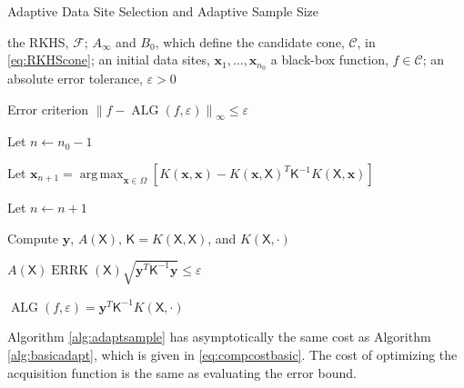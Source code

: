 \documentclass[]{mcom-l}
\theoremstyle{theorem}
\theoremstyle{remark}
\DeclareMathOperator*{\argmax}{arg\,max}
\DeclareMathOperator{\ALG}{ALG}
\DeclareMathOperator{\errK}{ERRK}
\newcommand{\mK}{\mathsf{K}}
\newcommand{\mX}{\mathsf{X}}
\newcommand{\bx}{{\boldsymbol{x}}}
\newcommand{\by}{{\boldsymbol{y}}}
\newcommand{\cc}{\mathcal{C}}
\newcommand{\calf}{{\mathcal{F}}}
\newcommand{\norm}[2][{}]{\ensuremath{\left \lVert #2 \right \rVert}_{#1}}
\begin{document}
\begin{algorithm}[H]
	\caption{Adaptive Data Site Selection and Adaptive Sample Size \label{alg:adaptsample}}
	\begin{algorithmic}
		\PARAM the RKHS, $\calf$; $A_\infty$ and $B_0$, which define  the candidate cone, $\cc$, in \eqref{eq:RKHScone}; an initial data sites, $\bx_1, \ldots, \bx_{n_0}$
		\INPUT a black-box function, $f \in \cc$; an absolute error tolerance, $\varepsilon>0$
		
		\Ensure Error criterion $\norm[\infty]{f - \ALG(f,\varepsilon)} \le \varepsilon$
		
		\State Let $n \leftarrow n_0 -1$
		
		\Repeat
		
		
		\State Let $ \bx_{n+1} = \displaystyle \argmax_{\bx \in \Omega} [K(\bx,\bx) - K(\bx,\mX)^T \mK^{-1} K(\mX,\bx)]$
		
		\EndIf
		
		\State Let $n \leftarrow n + 1$
		
		\State Compute $\by$, $A(\mX)$, $\mK = K(\mX,\mX)$, and $K(\mX,\cdot)$
		
		\Until $A(\mX) \errK(\mX) \sqrt{ \by^T \mK^{-1} \by }  \le \varepsilon$
		
		\RETURN $\ALG(f,\varepsilon) = \by^T \mK^{-1} K(\mX,\cdot)$
		
	\end{algorithmic}
\end{algorithm}

Algorithm \ref{alg:adaptsample} has asymptotically the same cost as Algorithm \ref{alg:basicadapt}, which is given in \eqref{eq:compcostbasic}.  The cost of optimizing the acquisition function is the same as evaluating the error bound.
\end{document}
